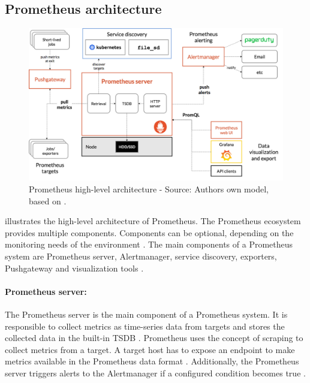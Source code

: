 \subsection{Prometheus architecture}


\begin{figure}[h]
\centering
\includegraphics[scale=0.25]{images/04_technical_background/prom_architecture}
\caption{Prometheus high-level architecture - Source: Authors own model, based on \cite{Prom2020Docs, Bastos2019Prom}.}
\label{fig:prom_architecture}
\end{figure}

 illustrates the high-level architecture of Prometheus.
The Prometheus ecosystem provides multiple components. Components can be optional, depending on the monitoring needs of the environment \cite{Bastos2019Prom}. The main components of a Prometheus system are Prometheus server, Alertmanager, service discovery, exporters, Pushgateway and visualization tools \cite{Prom2020Docs}.


\paragraph{Prometheus server:} 
The Prometheus server is the main component of a Prometheus system. It is responsible to collect metrics as time-series data from targets and stores the collected data in the built-in TSDB \cite{Bastos2019Prom}. Prometheus uses the concept of scraping to collect metrics from a target. A target host has to expose an endpoint to make metrics available in the Prometheus data format \cite{Pandey2020Monitoring}. Additionally, the Prometheus server triggers alerts to the Alertmanager if a configured condition becomes true \cite{Prom2020Docs}.


